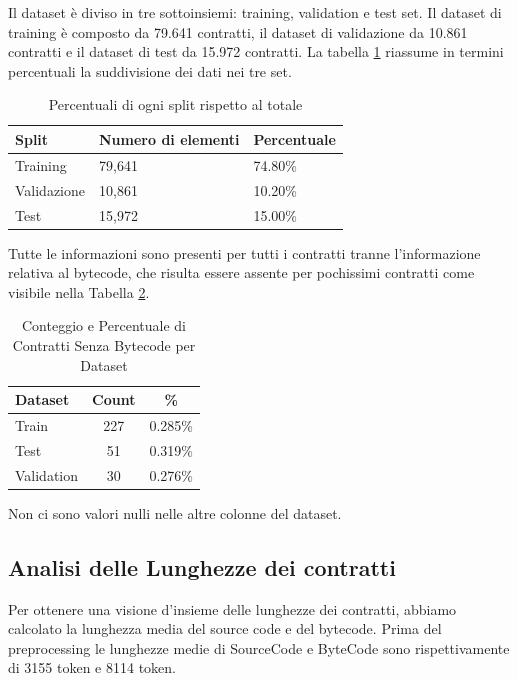 \documentclass[../../Thesis.tex]{subfiles}
\begin{document}
Il dataset è diviso in tre sottoinsiemi: training, validation e test set.
Il dataset di training è composto da 79.641 contratti, il dataset di validazione da 10.861 contratti e il dataset di test da 15.972 contratti. La tabella \ref{tab:split} riassume in termini percentuali la suddivisione dei dati nei tre set.
\begin{table}[h!]
    \centering
    \begin{tabular}{|l|l|l|}
    \hline
    \textbf{Split} & \textbf{Numero di elementi} & \textbf{Percentuale} \\ \hline
    Training       & 79,641                        & 74.80\%               \\ \hline
    Validazione    & 10,861                        & 10.20\%               \\ \hline
    Test           & 15,972                        & 15.00\%               \\ \hline
    \end{tabular}
    \caption{Percentuali di ogni split rispetto al totale}
    \label{tab:split}
\end{table}
    
Tutte le informazioni sono presenti per tutti i contratti tranne l'informazione relativa al bytecode, che risulta essere assente per pochissimi contratti come visibile nella Tabella \ref{tab:no_bytecode_count}. 
\begin{table}[h!]
    \centering
    \begin{tabular}{|l|c|c|}
        \hline
        \textbf{Dataset} & \textbf{Count} & \textbf{\%} \\
        \hline
        Train & 227 & 0.285\% \\
        Test & 51 & 0.319\% \\
        Validation & 30 & 0.276\% \\
        \hline
    \end{tabular}
    \caption{Conteggio e Percentuale di Contratti Senza Bytecode per Dataset}
    \label{tab:no_bytecode_count}
\end{table}
Non ci sono valori nulli nelle altre colonne del dataset.
\subsection{Analisi delle Lunghezze dei contratti}
Per ottenere una visione d'insieme delle lunghezze dei contratti, abbiamo calcolato la lunghezza media del source code e del bytecode. Prima del preprocessing le lunghezze medie di SourceCode e ByteCode sono rispettivamente di 3155 token e 8114 token.
\end{document}
